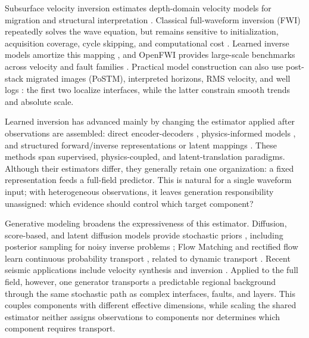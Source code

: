 \documentclass[letterpaper]{article}
\begin{document}
Subsurface velocity inversion estimates depth-domain velocity models for migration and structural interpretation \cite{stolt1978migration}. Classical full-waveform inversion (FWI) repeatedly solves the wave equation, but remains sensitive to initialization, acquisition coverage, cycle skipping, and computational cost \cite{tarantola1984inversion,bunks1995multiscale,pratt1998gaussnewton,virieux2009overview}. Learned inverse models amortize this mapping \cite{arayapolo2018deeptomography,yang2019deeplearning,wu2020inversionnet}, and OpenFWI provides large-scale benchmarks across velocity and fault families \cite{deng2022openfwi}. Practical model construction can also use post-stack migrated images (PoSTM), interpreted horizons, RMS velocity, and well logs \cite{stolt1978migration,dix1955velocities,hampson2001multiattribute}: the first two localize interfaces, while the latter constrain smooth trends and absolute scale.

Learned inversion has advanced mainly by changing the estimator applied after observations are assembled: direct encoder-decoders \cite{wu2020inversionnet,deng2022openfwi,najafi2025svinvnet}, physics-informed models \cite{rashtbehesht2022pinn,jin2022upfwi}, and structured forward/inverse representations or latent mappings \cite{feng2024autolinear,gupta2025gfi}. These methods span supervised, physics-coupled, and latent-translation paradigms. Although their estimators differ, they generally retain one organization: a fixed representation feeds a full-field predictor. This is natural for a single waveform input; with heterogeneous observations, it leaves generation responsibility unassigned: which evidence should control which target component?

Generative modeling broadens the expressiveness of this estimator. Diffusion, score-based, and latent diffusion models provide stochastic priors \cite{ho2020ddpm,song2021scorebased,rombach2022ldm}, including posterior sampling for noisy inverse problems \cite{chung2023diffusionposterior}; Flow Matching and rectified flow learn continuous probability transport \cite{lipman2023flowmatching,liu2023rectifiedflow}, related to dynamic transport \cite{benamou2000computational}. Recent seismic applications include velocity synthesis and inversion \cite{wang2024controllable,wang2024wavediffusion}. Applied to the full field, however, one generator transports a predictable regional background through the same stochastic path as complex interfaces, faults, and layers. This couples components with different effective dimensions, while scaling the shared estimator neither assigns observations to components nor determines which component requires transport.
\end{document}
